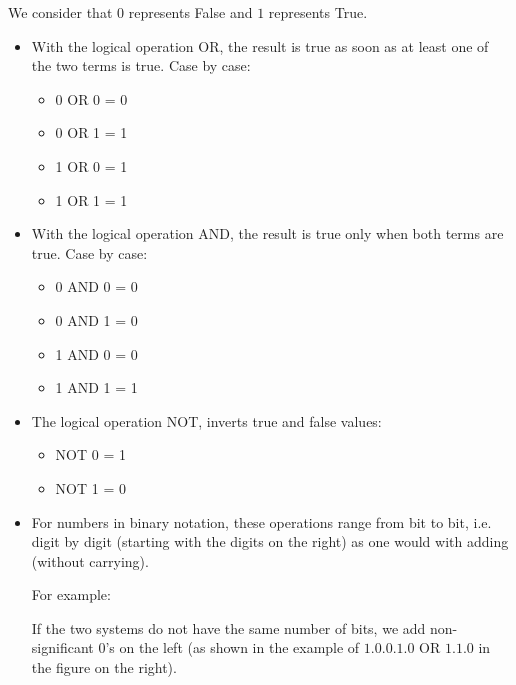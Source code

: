 \documentclass[11pt,class=report,crop=false]{standalone}
\begin{document}
\begin{cours}


We consider that $0$ represents \og{}False\fg{} and $1$ represents \og{}True\fg{}. 
\begin{itemize}
  \item With the logical operation \og{}OR\fg{}, the result is true as soon as at least one of the two terms is true. Case by case:
  \begin{itemize}
    \item 0 OR 0 = 0
    \item 0 OR 1 = 1
    \item 1 OR 0 = 1
    \item 1 OR 1 = 1
   \end{itemize}
   
  \item With the logical operation \og{}AND\fg{}, the result is true only when both terms are true. Case by case:
  \begin{itemize}
    \item 0 AND 0 = 0
    \item 0 AND 1 = 0
    \item 1 AND 0 = 0
    \item 1 AND 1 = 1
   \end{itemize}  
   
  \item The logical operation \og{}NOT\fg{}, inverts true and false values:
  \begin{itemize}
    \item NOT 0 = 1
    \item NOT 1 = 0
   \end{itemize}
   
    \item For numbers in binary notation, these operations range from bit to bit, i.e. digit by digit (starting with the digits on the right) as one would with adding (without carrying). 
    
 For example: 
    

If the two systems do not have the same number of bits, we add non-significant $0$'s on the left (as shown in the example of $1.0.0.1.0$ OR $1.1.0$ in the figure on the right).
\end{itemize}  
  
   

\end{cours}
\end{document}

